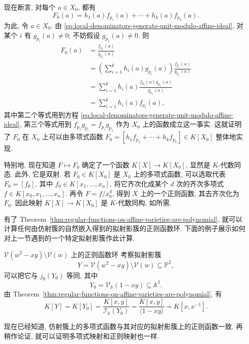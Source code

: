 \begin{Proof}
现在断言, 对每个 $a\in X_{0}$, 都有
\[
  F_{0}(a)=h_{1}(a)f_{p_{1}}(a)+\cdots+h_{k}(a)f_{p_{k}}(a).
\]
为此, 令 $a\in X_{0}$. 由 \eqref{eq:local-denominators-generate-unit-modulo-affine-ideal}, 对某个 $i$ 有 $g_{p_{i}}(a)\ne0$; 不妨假设 $g_{p_{1}}(a)\ne0$. 则
\[
  \begin{aligned}
  F_{0}(a)&=\frac{f_{p_{1}}(a)}{g_{p_{1}}(a)}\\
    &=\left(\sum_{i=1}^{k}h_{i}(a)g_{p_{i}}(a)\right)\frac{f_{p_{1}}(a)}{g_{p_{1}}(a)}\\
    &=\sum_{i=1}^{k}h_{i}(a)\frac{f_{p_{i}}(a)g_{p_{1}}(a)}{g_{p_{1}}(a)}\\
    &=\sum_{i=1}^{k}h_{i}(a)f_{p_{i}}(a),
  \end{aligned}
\]
其中第二个等式用到方程 \eqref{eq:local-denominators-generate-unit-modulo-affine-ideal}, 第三个等式用到 $f_{p_{1}}g_{p_{i}}=f_{p_{i}}g_{p_{1}}$ 作为 $X_{0}$ 上的函数成立这一事实. 这就证明了 $F_{0}$ 在 $X_{0}$ 上可以由多项式函数 $F_{0}=[h_{1}f_{p_{1}}+\cdots+h_{k}f_{p_{k}}]\in K[X_{0}]$ 整体地实现.

特别地, 现在知道 $F\mapsto F_{0}$ 确定了一个函数 $K[X]\to K[X_{0}]$, 显然是 $K$-代数同态. 此外, 它是双射. 若 $F_{0}\in K[X_{0}]$ 是 $X_{0}$ 上的多项式函数, 可以选取代表 $F_{0}=[f_{0}]$, 其中 $f_{0}\in K[x_{1},\ldots,x_{n}]$, 将它齐次化成某个 $d$ 次的齐次多项式 $f\in K[x_{0},x_{1},\ldots,x_{n}]$. 再令 $F=f/x_{0}^{d}$, 得到 $X$ 上的一个正则函数, 其去齐次化为 $F_{0}$. 因此映射 $K[X]\to K[X_{0}]$ 是 $K$-代数同构, 如所需.
\end{Proof}

有了 Theorem~\ref{thm:regular-functions-on-affine-varieties-are-polynomial}, 就可以计算任何由仿射簇的自然嵌入得到的拟射影簇的正则函数环. 下面的例子展示如何对上一节遇到的一个特定拟射影簇作此计算.

\begin{Example}{$\mathcal{V}(w^{2}-xy)\setminus\mathcal{V}(w)$ 上的正则函数环}\leavevmode\label{ex:regular-function-ring-of-punctured-projective-conic}
考察拟射影簇
\[
  Y=\mathcal{V}(w^{2}-xy)\setminus\mathcal{V}(w)\subseteq\mathbb{P}^{2},
\]
可以把它与 $j_{0}(Y_{0})$ 等同, 其中
\[
  Y_{0}=\mathcal{V}_{\mathbb{A}}(1-xy)\subseteq\mathbb{A}^{2}.
\]
由 Theorem~\ref{thm:regular-functions-on-affine-varieties-are-polynomial}, 有
\[
  K[Y]=K[Y_{0}]
   =\frac{K[x,y]}{\mathcal{I}_{\mathbb{A}}(Y_{0})}
   =\frac{K[x,y]}{\langle1-xy\rangle}=K[x,x^{-1}].
\]
\end{Example}

现在已经知道, 仿射簇上的多项式函数与其对应的拟射影簇上的正则函数一致. 再稍作论证, 就可以证明多项式映射和正则映射也一样.

